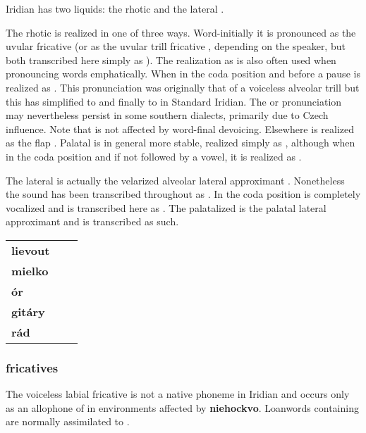 Iridian has two liquids: the rhotic  and the lateral .

The rhotic  is realized in one of three ways. Word-initially it is pronounced as the uvular fricative \nt{\textinvscr} (or as the uvular trill fricative \nt{\textraising{\textscr}}, depending on the speaker, but both transcribed here simply as \nt{\rrr}). The realization as \nt{\rrr} is also often used when pronouncing words emphatically. When in the coda position and before a pause  is realized as . This pronunciation was originally that of a voiceless alveolar trill  but this has simplified to  and finally to  in Standard Iridian. The  or  pronunciation may nevertheless persist in some southern dialects, primarily due to Czech influence. Note that  is not affected by word-final devoicing. Elsewhere  is realized as the flap . Palatal  is in general more stable, realized simply as , although when in the coda position and if not followed by a vowel, it is realized as .

The lateral  is actually the velarized alveolar lateral approximant \nt{\textltilde}. Nonetheless the sound has been transcribed throughout as . In the coda position  is completely vocalized and is transcribed here as . The palatalized  is the palatal lateral approximant  and is transcribed as such.

\begin{center}
	\centering \small
	\begin{tabularx}{0.8\textwidth}{>{\bfseries}YYY}
		lievout		&  	& \\
		mielko	 	& 		& \\
		\'or		& 				& \\
		git\'ary	& 		& \\
		r\'ad		& 			& \\
	\end{tabularx}
\end{center}

\subsubsection{fricatives}
The voiceless labial fricative  is not a native phoneme in Iridian and occurs only as an allophone of  in environments affected by \textbf{niehockvo}. Loanwords containing  are normally assimilated to .

